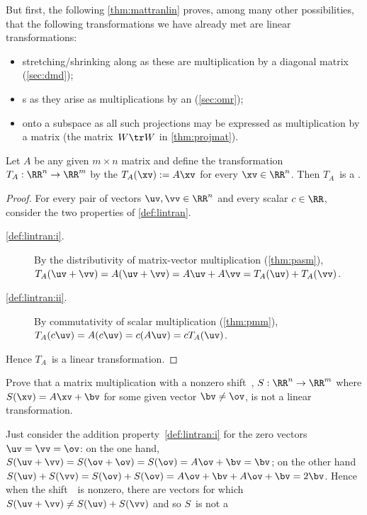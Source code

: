 \begin{example} 
But first, the following \cref{thm:mattranlin} proves, among many other possibilities, that the following transformations we have already met are linear transformations:
\begin{itemize}
\item stretching\slash shrinking along  as these are multiplication by a diagonal matrix (\cref{sec:dmd});
\item {}s as they arise as multiplications by an  (\cref{sec:omr});
\item {} onto a subspace as all such projections may be expressed as multiplication by a matrix (the matrix~\(W\tr W\) in \cref{thm:projmat}).
\aqed
\end{itemize}
\end{example}


\begin{theorem} \label{thm:mattranlin} 
Let \(A\) be any given \(m\times n\) matrix and define the transformation \(T_A:\RR^n\to\RR^m\)  by the  \(T_A(\xv):=A\xv\) for every \(\xv\in\RR^n\). 
Then \(T_A\)~is a .
\end{theorem}
\begin{proof} 
For every pair of vectors \(\uv,\vv\in\RR^n\) and every scalar \(c\in\RR\), consider the two properties of \cref{def:lintran}.
\begin{description}
\item[\ref{def:lintran:i}.] By the distributivity of matrix-vector multiplication (\cref{thm:pasm}), \(T_A(\uv+\vv)=A(\uv+\vv)=A\uv+A\vv=T_A(\uv)+T_A(\vv)\).
\item[\ref{def:lintran:ii}.] By commutativity of scalar multiplication (\cref{thm:pmm}), \(T_A(c\uv)=A(c\uv)=c(A\uv)=cT_A(\uv)\).
\end{description}
Hence \(T_A\)~is a linear transformation.
\end{proof}



\begin{example} 
Prove that a matrix multiplication with a nonzero shift~\bv, \(S:\RR^n\to\RR^m\) where \(S(\xv)=A\xv+\bv\) for some given vector \(\bv\neq\ov\), is not a linear transformation.
\begin{solution} 
Just consider the addition property~\ref{def:lintran:i} for the zero vectors \(\uv=\vv=\ov\):  
on the one hand, \(S(\uv+\vv)=S(\ov+\ov)=S(\ov)=A\ov+\bv=\bv\); 
on the other hand \(S(\uv)+S(\vv)=S(\ov)+S(\ov)=A\ov+\bv+A\ov+\bv=2\bv\).  
Hence when the shift~\bv\ is nonzero, there are vectors for which \(S(\uv+\vv)\neq S(\uv)+S(\vv)\) and so \(S\)~is not a 
\end{solution}
\end{example}



